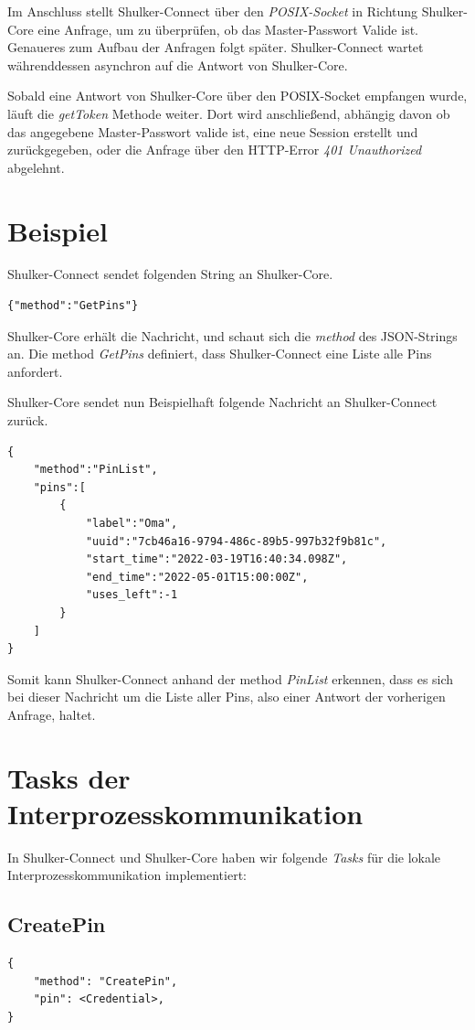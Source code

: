 Im Anschluss stellt Shulker-Connect über den \textit{POSIX-Socket} in Richtung Shulker-Core eine Anfrage, um zu
überprüfen, ob das Master-Passwort Valide ist. Genaueres zum Aufbau der Anfragen folgt später.
Shulker-Connect wartet währenddessen asynchron auf die Antwort von Shulker-Core.

Sobald eine Antwort von Shulker-Core über den POSIX-Socket empfangen wurde, läuft die \textit{getToken} 
Methode weiter. Dort wird anschließend, abhängig davon ob das angegebene Master-Passwort valide ist, eine neue Session 
erstellt und zurückgegeben, oder die Anfrage über den HTTP-Error \textit{401 Unauthorized} abgelehnt.

\section{Beispiel}
Shulker-Connect sendet folgenden String an Shulker-Core.
\begin{lstlisting}
{"method":"GetPins"}
\end{lstlisting}
Shulker-Core erhält die Nachricht, und schaut sich die \textit{method} des JSON-Strings an.
Die method \textit{GetPins} definiert, dass Shulker-Connect eine Liste alle Pins anfordert.

Shulker-Core sendet nun Beispielhaft folgende Nachricht an Shulker-Connect zurück.
\begin{lstlisting}
{
    "method":"PinList",
    "pins":[
        {
            "label":"Oma",
            "uuid":"7cb46a16-9794-486c-89b5-997b32f9b81c",
            "start_time":"2022-03-19T16:40:34.098Z",
            "end_time":"2022-05-01T15:00:00Z",
            "uses_left":-1
        }
    ]
}
\end{lstlisting}
Somit kann Shulker-Connect anhand der method \textit{PinList} erkennen, dass es sich bei dieser Nachricht um die Liste
aller Pins, also einer Antwort der vorherigen Anfrage, haltet.

\pagebreak
\section{Tasks der Interprozesskommunikation}
In Shulker-Connect und Shulker-Core haben wir folgende \textit{Tasks} für die lokale Interprozesskommunikation implementiert:

\subsection{CreatePin}
\begin{lstlisting}
{
    "method": "CreatePin",
    "pin": <Credential>,
}
\end{lstlisting}

